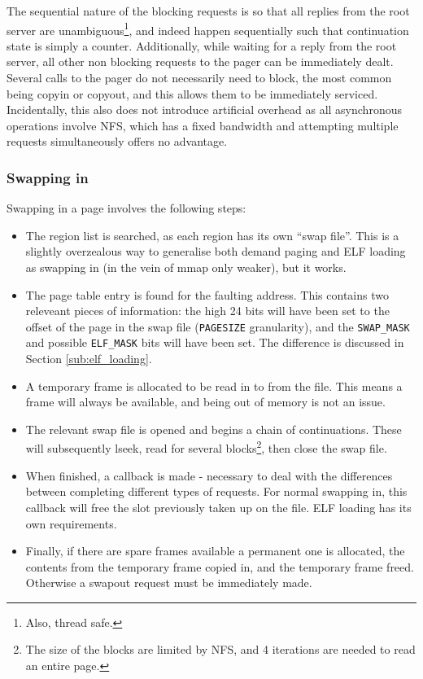 \documentclass[12pt,english]{article}
\begin{document}
The sequential nature of the blocking requests is so that all replies from the root server are unambiguous\footnote{Also, thread safe.}, and indeed happen sequentially such that continuation state is simply a counter.  Additionally, while waiting for a reply from the root server, all other non blocking requests to the pager can be immediately dealt.  Several calls to the pager do not necessarily need to block, the most common being copyin or copyout, and this allows them to be immediately serviced.  Incidentally, this also does not introduce artificial overhead as all asynchronous operations involve NFS, which has a fixed bandwidth and attempting multiple requests simultaneously offers no advantage.

\subsubsection{Swapping in}

Swapping in a page involves the following steps:
\begin{itemize}
\item The region list is searched, as each region has its own ``swap file''.  This is a slightly overzealous way to generalise both demand paging and ELF loading as swapping in (in the vein of mmap only weaker), but it works.
\item The page table entry is found for the faulting address.  This contains two releveant pieces of information: the high 24 bits will have been set to the offset of the page in the swap file (\texttt{PAGESIZE} granularity), and the \texttt{SWAP\_MASK} and possible \texttt{ELF\_MASK} bits will have been set.  The difference is discussed in Section \ref{sub:elf_loading}.
\item A temporary frame is allocated to be read in to from the file.  This means a frame will always be available, and being out of memory is not an issue.
\item The relevant swap file is opened and begins a chain of continuations.  These will subsequently lseek, read for several blocks\footnote{The size of the blocks are limited by NFS, and 4 iterations are needed to read an entire page.}, then close the swap file.
\item When finished, a callback is made - necessary to deal with the differences between completing different types of requests.  For normal swapping in, this callback will free the slot previously taken up on the file.  ELF loading has its own requirements.
\item Finally, if there are spare frames available a permanent one is allocated, the contents from the temporary frame copied in, and the temporary frame freed.  Otherwise a swapout request must be immediately made.
\end{itemize}
\end{document}
